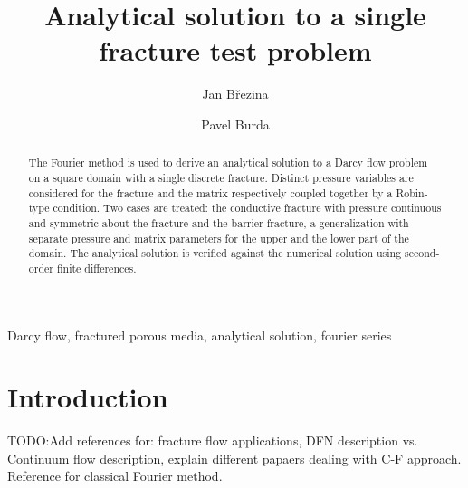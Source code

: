 \documentclass{elsarticle}
\def\todo#1{{TODO:\color{red}#1}}
\begin{document}
\begin{frontmatter}

\title{Analytical solution to a single fracture test problem
}
\author[1]{Jan B\v rezina%
}
\address[1]{Technical University in Liberec, Studentsk\'a 2, Liberec, Czech Republic.}
\author[2]{Pavel Burda%
}
\address[2]{Czech Technical University, Prague, Czech Republic.}

\begin{abstract}
The Fourier method is used to derive an analytical solution to a Darcy flow problem on a square domain with a single discrete fracture. Distinct pressure variables are considered for the fracture and the matrix respectively coupled together by a 
Robin-type condition. 
Two cases are treated: the conductive fracture with pressure continuous and symmetric about the fracture and the barrier fracture,
a generalization with separate pressure and matrix parameters for the upper and the lower part of the domain. The analytical solution is verified against the numerical solution using second-order finite differences. 
\end{abstract}

\begin{keyword}
Darcy flow,
fractured porous media,
analytical solution, 
fourier series



\end{keyword}

\end{frontmatter}






\section{Introduction}
\todo{Add references for:
fracture flow applications, DFN description vs. Continuum flow description, explain different papaers dealing with C-F approach. 
Reference for classical Fourier method.}
\end{document}
